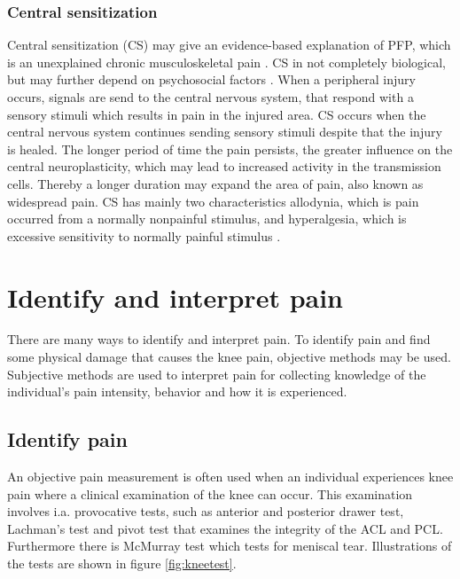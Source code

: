 \subsubsection{Central sensitization}
Central sensitization (CS) may give an evidence-based explanation of PFP, which is an unexplained chronic musculoskeletal pain \citep{Nijs2011, Matre2012}. CS in not completely biological, but may further depend on psychosocial factors \citep{Yunus2007}. \newline
\noindent
When a peripheral injury occurs, signals are send to the central nervous system, that respond with a sensory stimuli which results in pain in the injured area. CS occurs when the central nervous system continues sending sensory stimuli despite that the injury is healed. The longer period of time the pain persists, the greater influence on the central neuroplasticity, which may lead to increased activity in the transmission cells. Thereby a longer duration may expand the area of pain, also known as widespread pain.\citep{Oesteraas2010, Mayer2011, Yunus2007}\newline
\noindent
CS has mainly two characteristics allodynia, which is pain occurred from a normally nonpainful stimulus, and hyperalgesia, which is excessive sensitivity to normally painful stimulus \citep{Yunus2007, Oesteraas2010, Mayer2011}.
\newpage

\section{Identify and interpret pain}
There are many ways to identify and interpret pain. To identify pain and find some physical damage that causes the knee pain, objective methods may be used. Subjective methods are used to interpret pain for collecting knowledge of the individual's pain intensity, behavior and how it is experienced.\citep{Younger2009}

\subsection{Identify pain}
An objective pain measurement is often used when an individual experiences knee pain where a clinical examination of the knee can occur. This examination involves i.a. provocative tests, such as anterior and posterior drawer test, Lachman’s test and pivot test that examines the integrity of the ACL and PCL. Furthermore there is McMurray test which tests for meniscal tear.\citep{Ghosh2010} Illustrations of the tests are shown in figure \ref{fig:kneetest}.

